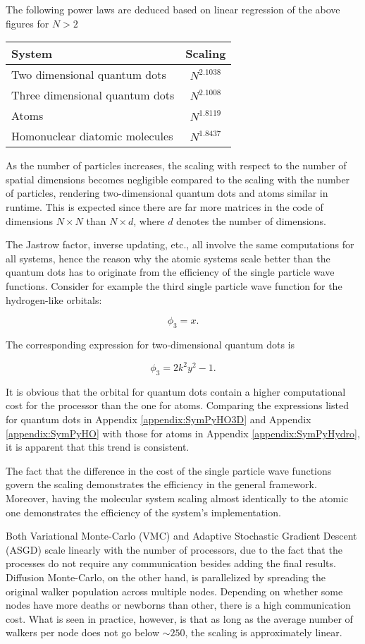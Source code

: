 The following power laws are deduced based on linear regression of the above figures for $N > 2$

\begin{tabular}{l|c}
System & Scaling \\
\hline
Two dimensional quantum dots & $N^{2.1038}$ \\
Three dimensional quantum dots & $N^{2.1008}$ \\
Atoms & $N^{1.8119}$ \\
Homonuclear diatomic molecules & $N^{1.8437}$ \\ 
\end{tabular}


As the number of particles increases, the scaling with respect to the number of spatial dimensions becomes negligible compared to the scaling with the number of particles, rendering two-dimensional quantum dots and atoms similar in runtime. This is expected since there are far more matrices in the code of dimensions $N\times N$ than $N \times d$, where $d$ denotes the number of dimensions. 

The Jastrow factor, inverse updating, etc., all involve the same computations for all systems, hence the reason why the atomic systems scale better than the quantum dots has to originate from the efficiency of the single particle wave functions. Consider for example the third single particle wave function for the hydrogen-like orbitals:

\begin{equation}
 \phi_3 = x.
\end{equation}

The corresponding expression for two-dimensional quantum dots is

\begin{equation}
  \phi_3 = 2k^2y^2 - 1.
\end{equation}

It is obvious that the orbital for quantum dots contain a higher computational cost for the processor than the one for atoms. Comparing the expressions listed for quantum dots in Appendix \ref{appendix:SymPyHO3D} and Appendix \ref{appendix:SymPyHO} with those for atoms in Appendix \ref{appendix:SymPyHydro}, it is apparent that this trend is consistent.

The fact that the difference in the cost of the single particle wave functions govern the scaling demonstrates the efficiency in the general framework. Moreover, having the molecular system scaling almost identically to the atomic one demonstrates the efficiency of the system's implementation. 

Both Variational Monte-Carlo (VMC) and Adaptive Stochastic Gradient Descent (ASGD) scale linearly with the number of processors, due to the fact that the processes do not require any communication besides adding the final results. Diffusion Monte-Carlo, on the other hand, is parallelized by spreading the original walker population across multiple nodes. Depending on whether some nodes have more deaths or newborns than other, there is a high communication cost. What is seen in practice, however, is that as long as the average number of walkers per node does not go below $\sim250$, the scaling is approximately linear. 




